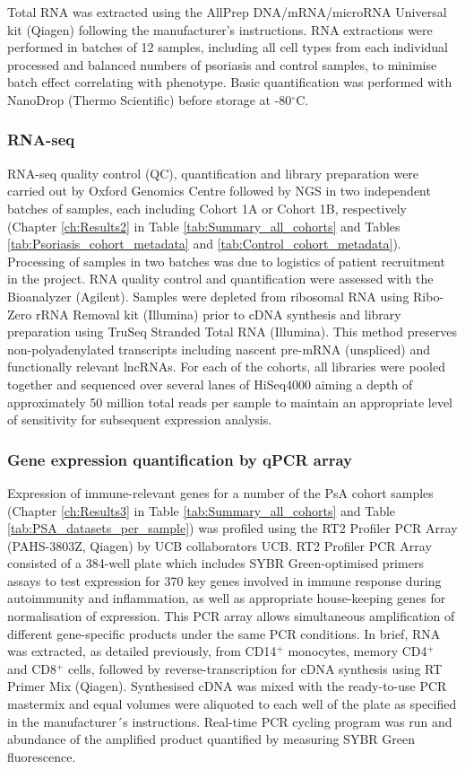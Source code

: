 Total RNA was extracted using the AllPrep DNA/mRNA/microRNA Universal kit (Qiagen) following the manufacturer's instructions. RNA extractions were performed in batches of 12 samples, including all cell types from each individual processed and balanced numbers of psoriasis and control samples, to minimise batch effect correlating with phenotype. Basic quantification was performed with NanoDrop (Thermo Scientific) before storage at -80{$^\circ$}C.

\subsubsection{RNA-seq}
RNA-seq quality control (QC), quantification and library preparation were carried out by Oxford Genomics Centre followed by NGS in two independent batches of samples, each including Cohort 1A or Cohort 1B, respectively (Chapter \ref{ch:Results2} in Table \ref{tab:Summary_all_cohorts} and Tables \ref{tab:Psoriasis_cohort_metadata} and \ref{tab:Control_cohort_metadata}). Processing of samples in two batches was due to logistics of patient recruitment in the project. RNA quality control and quantification were assessed with the Bioanalyzer (Agilent). Samples were depleted from ribosomal RNA using Ribo-Zero rRNA Removal kit (Illumina) prior to cDNA synthesis and library preparation using TruSeq Stranded Total RNA (Illumina). This method preserves non-polyadenylated transcripts including nascent pre-mRNA (unspliced) and functionally relevant lncRNAs. For each of the cohorts, all libraries were pooled together and sequenced over several lanes of HiSeq4000 aiming a depth of approximately 50 million total reads per sample to maintain an appropriate level of sensitivity for subsequent expression analysis.

\subsubsection{Gene expression quantification by qPCR array}
\textcolor[rgb]{1,0,0}{Expression of immune-relevant genes for a number of the PsA cohort samples (Chapter \ref{ch:Results3} in Table \ref{tab:Summary_all_cohorts} and Table \ref{tab:PSA_datasets_per_sample}) was profiled using the RT2 Profiler PCR Array (PAHS-3803Z, Qiagen) by UCB collaborators UCB. RT2 Profiler PCR Array consisted of a 384-well plate which includes SYBR Green-optimised primers assays to test expression for 370 key genes involved in immune response during autoimmunity and inflammation, as well as appropriate house-keeping genes for normalisation of expression. This PCR array allows simultaneous amplification of different gene-specific products under the same PCR conditions. In brief, RNA was extracted, as detailed previously, from CD14$^+$ monocytes, memory CD4$^+$ and CD8$^+$ cells, followed by reverse-transcription for cDNA synthesis using RT Primer Mix (Qiagen). Synthesised cDNA was mixed with the ready-to-use PCR mastermix and equal volumes were aliquoted to each well of the plate as specified in the manufacturer´s instructions. Real-time PCR cycling program was run and abundance of the amplified product quantified by measuring SYBR Green fluorescence. } 



